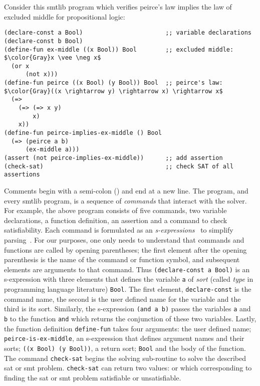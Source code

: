 Consider this \acl{smtlib} program
which verifies peirce's law implies the law of excluded middle for propositional
logic:
%
\begin{lstlisting}[columns=flexible,keepspaces=true,language=SMTLIB]
(declare-const a Bool)                       ;; variable declarations
(declare-const b Bool)
(define-fun ex-middle ((x Bool)) Bool        ;; excluded middle: $\color{Gray}x \vee \neg x$
  (or x
      (not x)))
(define-fun peirce ((x Bool) (y Bool)) Bool  ;; peirce's law: $\color{Gray}((x \rightarrow y) \rightarrow x) \rightarrow x$
  (=>
    (=> (=> x y)
        x)
    x))
(define-fun peirce-implies-ex-middle () Bool
  (=> (peirce a b)
      (ex-middle a)))
(assert (not peirce-implies-ex-middle))      ;; add assertion
(check-sat)                                  ;; check SAT of all assertions
\end{lstlisting}
%
Comments begin with a semi-colon (\rn{;}) and end at a new line. The program,
and every \acl{smtlib} program, is a sequence of \emph{commands} that interact
with the solver. For example, the above program consists of five commands, two
variable declarations, a function definition, an assertion and a command to
check satisfiability. Each command is formulated as an
\emph{s-expressions}~\cite{10.1145/367177.367199} to simplify
parsing~\cite{BarFT-SMTLIB}. For our purposes, one only needs to understand that
commands and functions are called by opening parentheses; the first element
after the opening parenthesis is the name of the command or function symbol, and
subsequent elements are arguments to that command. Thus
\lstinline{(declare-const a Bool)} is an s-expression with three elements that
defines the \pl{} variable \lstinline{a} of \emph{sort} (called \emph{type} in
programming language literature) \lstinline{Bool}. The first element,
\lstinline{declare-const} is the command name, the second is the user defined
name for the variable and the third is its sort. Similarly, the s-expression
\lstinline{(and a b)} passes the variables \lstinline{a} and \lstinline{b} to
the function \lstinline{and} which returns the conjunction of these two
variables. Lastly, the function definition \lstinline{define-fun} takes four
arguments: the user defined name; \lstinline{peirce-is-ex-middle}, an
s-expression that defines argument names and their sorts;
\lstinline{((x Bool) (y Bool))}, a return sort; \lstinline{Bool} and the body of
the function. The command \lstinline{check-sat} begins the solving sub-routine
to solve the described \ac{sat} or \ac{smt} problem. \lstinline{check-sat} can
return two values:  or  which corresponding to finding the
\ac{sat} or \ac{smt} problem satisfiable or unsatisfiable.

